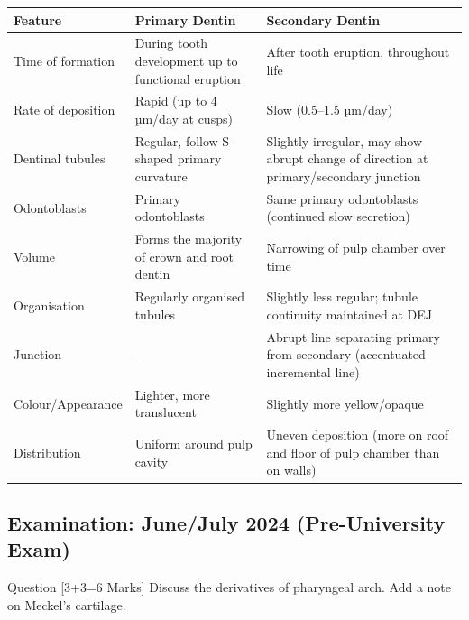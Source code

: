 \documentclass[11pt,a4paper]{article}
\begin{document}
\begin{ansbox}
\begin{center}
\begin{tabular}{p{3.5cm}p{5cm}p{5cm}}
\toprule
\textbf{Feature} & \textbf{Primary Dentin} & \textbf{Secondary Dentin} \\
\midrule
Time of formation & During tooth development up to functional eruption & After tooth eruption, throughout life \\
Rate of deposition & Rapid (up to 4 µm/day at cusps) & Slow (0.5--1.5 µm/day) \\
Dentinal tubules & Regular, follow S-shaped primary curvature & Slightly irregular, may show abrupt change of direction at primary/secondary junction \\
Odontoblasts & Primary odontoblasts & Same primary odontoblasts (continued slow secretion) \\
Volume & Forms the majority of crown and root dentin & Narrowing of pulp chamber over time \\
Organisation & Regularly organised tubules & Slightly less regular; tubule continuity maintained at DEJ \\
Junction & -- & Abrupt line separating primary from secondary (accentuated incremental line) \\
Colour/Appearance & Lighter, more translucent & Slightly more yellow/opaque \\
Distribution & Uniform around pulp cavity & Uneven deposition (more on roof and floor of pulp chamber than on walls) \\
\bottomrule
\end{tabular}
\end{center}
\end{ansbox}

\subsection{Examination: June/July 2024 (Pre-University Exam)}

\begin{qbox}{Question [3+3=6 Marks]}
Discuss the derivatives of pharyngeal arch. Add a note on Meckel's cartilage.
\end{qbox}
\end{document}
